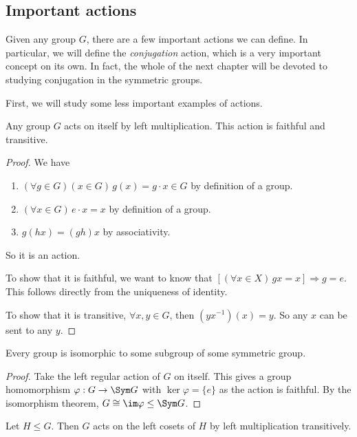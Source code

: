 \documentclass[a4paper]{article}
\begin{document}
\subsection{Important actions}
Given any group $G$, there are a few important actions we can define. In particular, we will define the \emph{conjugation} action, which is a very important concept on its own. In fact, the whole of the next chapter will be devoted to studying conjugation in the symmetric groups.

First, we will study some less important examples of actions.
\begin{lemma}
  Any group $G$ acts on itself by left multiplication. This action is faithful and transitive.
\end{lemma}
\begin{proof}
  We have
  \begin{enumerate}[label=\arabic{*}.]
    \item $(\forall g\in G)(x\in G)\,g(x) = g\cdot x \in G$ by definition of a group.
    \item $(\forall x\in G)\,e\cdot x = x$ by definition of a group.
    \item $g(hx) = (gh)x$ by associativity.
  \end{enumerate}
  So it is an action.

  To show that it is faithful, we want to know that $[(\forall x\in X)\,gx = x]\Rightarrow g = e$. This follows directly from the uniqueness of identity.

  To show that it is transitive, $\forall x, y\in G$, then $(yx^{-1})(x) = y$. So any $x$ can be sent to any $y$.
\end{proof}

\begin{thm}
  Every group is isomorphic to some subgroup of some symmetric group.
\end{thm}

\begin{proof}
  Take the left regular action of $G$ on itself. This gives a group homomorphism $\varphi: G\to \Sym G$ with $\ker \varphi = \{e\}$ as the action is faithful. By the isomorphism theorem, $G \cong \im \varphi \leq \Sym G$.
\end{proof}

\begin{lemma}
  Let $H\leq G$. Then $G$ acts on the left cosets of $H$ by left multiplication transitively.
\end{lemma}
\end{document}
